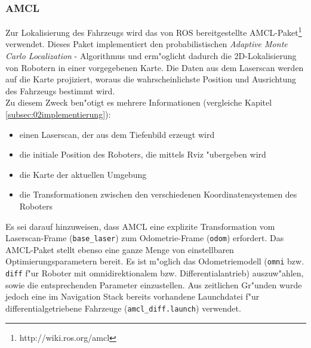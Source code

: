 \subsubsection{AMCL}
\label{subsec:02amcl}

Zur Lokalisierung des Fahrzeugs wird das von ROS bereitgestellte AMCL-Paket\footnote{http://wiki.ros.org/amcl} verwendet. Dieses Paket implementiert den probabilistischen \emph{Adaptive Monte Carlo Localization} - Algorithmus\cite{amcl} und erm"oglicht dadurch die 2D-Lokalisierung von Robotern in einer vorgegebenen Karte. Die Daten aus dem Laserscan werden auf die Karte projiziert, woraus die wahrscheinlichste Position und Ausrichtung des Fahrzeugs bestimmt wird.\\
Zu diesem Zweck ben"otigt es mehrere Informationen (vergleiche Kapitel \ref{subsec:02implementierung}): 
\begin{itemize}
\item einen Laserscan, der aus dem Tiefenbild erzeugt wird 
\item die initiale Position des Roboters, die mittels  Rviz "ubergeben wird
\item die Karte der aktuellen Umgebung
\item die Transformationen zwischen den verschiedenen Koordinatensystemen des Roboters
\end{itemize}
Es sei darauf hinzuweisen, dass AMCL eine explizite Transformation vom Laserscan-Frame (\texttt{base\_laser}) zum Odometrie-Frame (\texttt{odom}) erfordert.
Das AMCL-Paket stellt ebenso eine ganze Menge von einstellbaren Optimierungsparametern bereit. Es ist m"oglich das Odometriemodell (\texttt{omni} bzw. \texttt{diff} f"ur Roboter mit omnidirektionalem bzw. Differentialantrieb) auszuw"ahlen, sowie die entsprechenden Parameter einzustellen. Aus zeitlichen Gr"unden wurde jedoch eine im Navigation Stack bereits vorhandene Launchdatei f"ur differentialgetriebene Fahrzeuge (\texttt{amcl\_diff.launch}) verwendet.